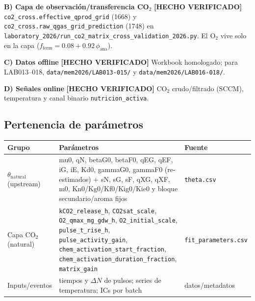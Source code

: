 \documentclass[11pt,a4paper]{article}
\newcommand{\code}[1]{\nolinkurl{#1}}
\newcommand{\hecho}{\textcolor{hecho}{\textbf{[HECHO VERIFICADO]}}}
\newcommand{\ruta}[1]{\texttt{\small #1}}
\begin{document}
\textbf{B) Capa de observaci\'on/transferencia CO$_2$} \hecho{} \code{co2_cross.effective_qprod_grid} (1668) y \code{co2_cross.raw_qgas_grid_prediction} (1748) en \code{laboratory_2026/run_co2_matrix_cross_validation_2026.py}. El O$_2$ vive solo en la capa ($f_{\mathrm{ferm}} = 0.08 + 0.92\,\phi_{\mathrm{ana}}$).

\textbf{C) Datos offline} \hecho{} Workbook homologado; para LAB013--018, \ruta{data/mem2026/LAB013-015/} y \ruta{data/mem2026/LAB016-018/}.

\textbf{D) Se\~nales online} \hecho{} CO$_2$ crudo/filtrado (SCCM), temperatura y canal binario \ruta{nutricion\_activa}.

\subsection{Pertenencia de par\'ametros}
\begin{table}[h]\centering\small
\begin{tabularx}{\textwidth}{P{2.9cm}L P{3.2cm}}
\toprule
Grupo & Par\'ametros & Fuente \\
\midrule
$\theta_{\mathrm{natural}}$ (upstream) & mu0, qN, betaG0, betaF0, qEG, qEF, iG, iE, Kd0, gammaG0, gammaF0 (re-estimados) + sN, sG, sF, qXG, qXF, m0, Kn0/Kg0/Kf0/Kig0/Kie0 y bloque secundario/aroma fijos & \ruta{theta.csv} \\
Capa CO$_2$ (natural) & \code{kCO2_release_h}, \code{CO2sat_scale}, \code{O2_qmax_mg_gdw_h}, \code{O2_initial_scale}, \code{pulse_t_rise_h}, \code{pulse_activity_gain}, \code{chem_activation_start_fraction}, \code{chem_activation_duration_fraction}, \code{matrix_gain} & \ruta{fit\_parameters.csv} \\
Inputs/eventos & tiempos y $\Delta N$ de pulsos; series de temperatura; ICs por batch & datos/metadatos \\
\bottomrule
\end{tabularx}
\end{table}
\end{document}
